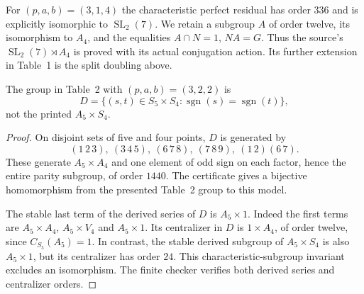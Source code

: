 \documentclass[11pt,a4paper]{article}
\begin{document}
For $(p,a,b)=(3,1,4)$ the characteristic perfect residual has order
$336$ and is explicitly isomorphic to $\operatorname{SL}_2(7)$.
We retain a subgroup $A$ of order twelve, its isomorphism to $A_4$, and
the equalities $A\cap N=1$, $NA=G$. Thus the source's
$\operatorname{SL}_2(7)\rtimes A_4$ is proved with its actual conjugation
action. Its further extension in Table~1 is the split doubling above.

\begin{proposition}\label{correction}
The group in Table~2 with $(p,a,b)=(3,2,2)$ is
\[
 D=\{(s,t)\in S_5\times S_4:\operatorname{sgn}(s)=\operatorname{sgn}(t)\},
\]
not the printed $A_5\times S_4$.
\end{proposition}
\begin{proof}
On disjoint sets of five and four points, $D$ is generated by
\[
 (1\,2\,3),\ (3\,4\,5),\ (6\,7\,8),\ (7\,8\,9),\ (1\,2)(6\,7).
\]
These generate $A_5\times A_4$ and one element of odd sign on each
factor, hence the entire parity subgroup, of order $1440$.
The certificate gives a bijective homomorphism from the presented
Table~2 group to this model.

The stable last term of the derived series of $D$ is $A_5\times1$.
Indeed the first terms are $A_5\times A_4$, $A_5\times V_4$ and
$A_5\times1$. Its centralizer in $D$ is $1\times A_4$, of order twelve,
since $C_{S_5}(A_5)=1$. In contrast, the stable derived subgroup of
$A_5\times S_4$ is also $A_5\times1$, but its centralizer has order
$24$. This characteristic-subgroup invariant excludes an isomorphism.
The finite checker verifies both derived series and centralizer orders.
\end{proof}
\end{document}

